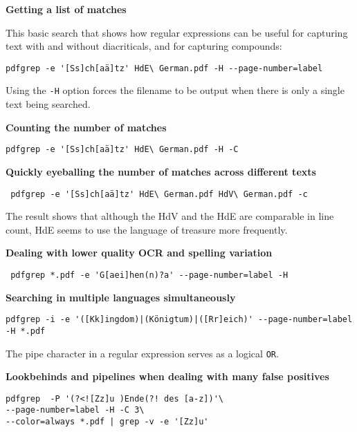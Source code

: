 \documentclass[
  letterpaper,
]{tufte-handout}
\begin{document}
\textbf{Getting a list of matches}

This basic search that shows how regular expressions can be useful for
capturing text with and without diacriticals, and for capturing
compounds:

\begin{verbatim}
pdfgrep -e '[Ss]ch[aä]tz' HdE\ German.pdf -H --page-number=label
\end{verbatim}

Using the \texttt{-H} option forces the filename to be
output when there is only a single text being searched.

\textbf{Counting the number of matches}

\begin{verbatim}
pdfgrep -e '[Ss]ch[aä]tz' HdE\ German.pdf -H -C
\end{verbatim}

\textbf{Quickly eyeballing the number of matches across different texts}

\begin{verbatim}
 pdfgrep -e '[Ss]ch[aä]tz' HdE\ German.pdf HdV\ German.pdf -c
\end{verbatim}

The result shows that although the HdV and the HdE are comparable in
line count, HdE seems to use the language of treasure more frequently.

\textbf{Dealing with lower quality OCR and spelling variation}

\begin{verbatim}
 pdfgrep *.pdf -e 'G[aei]hen(n)?a' --page-number=label -H
\end{verbatim}

\textbf{Searching in multiple languages simultaneously}

\begin{verbatim}
pdfgrep -i -e '([Kk]ingdom)|(Königtum)|([Rr]eich)' --page-number=label -H *.pdf
\end{verbatim}

The pipe character in a regular expression serves as a logical
\texttt{OR}.

\textbf{Lookbehinds and pipelines when dealing with many false
positives}

\begin{verbatim}
pdfgrep  -P '(?<![Zz]u )Ende(?! des [a-z])'\
--page-number=label -H -C 3\
--color=always *.pdf | grep -v -e '[Zz]u'
\end{verbatim}
\end{document}
